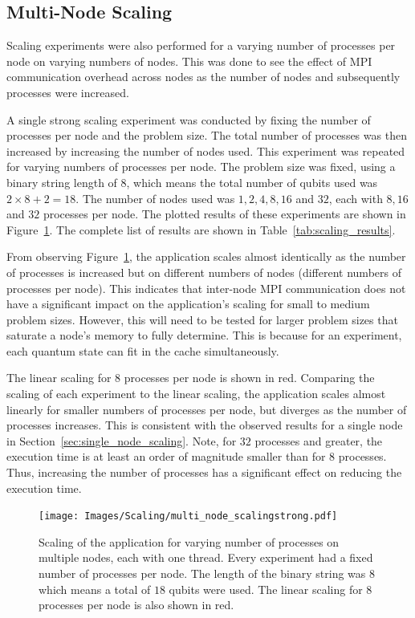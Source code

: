 \subsection{Multi-Node Scaling}
\label{sec:multi_node_scaling}
Scaling experiments were also performed for a varying number of processes per node on varying numbers of nodes. This was done to see the effect of MPI communication overhead across nodes as the number of nodes and subsequently processes were increased.

A single strong scaling experiment was conducted by fixing the number of processes per node and the problem size. The total number of processes was then increased by increasing the number of nodes used. This experiment was repeated for varying numbers of processes per node. The problem size was fixed, using a binary string length of $8$, which means the total number of qubits used was $2\times 8 + 2 = 18$. The number of nodes used was $1,2,4,8,16$ and $32$, each with $8,16$ and $32$ processes per node. The plotted results of these experiments are shown in Figure~\ref{fig:scaling_multi_node}. The complete list of results are shown in Table~\ref{tab:scaling_results}.

From observing Figure~\ref{fig:scaling_multi_node}, the application scales almost identically as the number of processes is increased but on different numbers of nodes (different numbers of processes per node). This indicates that inter-node MPI communication does not have a significant impact on the application's scaling for small to medium problem sizes. However, this will need to be tested for larger problem sizes that saturate a node's memory to fully determine. This is because for an experiment, each quantum state can fit in the cache simultaneously. 

The linear scaling for $8$ processes per node is shown in red. Comparing the scaling of each experiment to the linear scaling, the application scales almost linearly for smaller numbers of processes per node, but diverges as the number of processes increases. This is consistent with the observed results for a single node in Section~\ref{sec:single_node_scaling}. Note, for $32$ processes and greater, the execution time is at least an order of magnitude smaller than for $8$ processes. Thus, increasing the number of processes has a significant effect on reducing the execution time.

\begin{figure}[htbp]
    \centering
    \texttt{[image: Images/Scaling/multi\_node\_scalingstrong.pdf]}
    \caption{Scaling of the application for varying number of processes on multiple nodes, each with one thread. Every experiment had a fixed number of processes per node. The length of the binary string was $8$ which means a total of $18$ qubits were used. The linear scaling for $8$ processes per node is also shown in red.}
    \label{fig:scaling_multi_node}
\end{figure}


